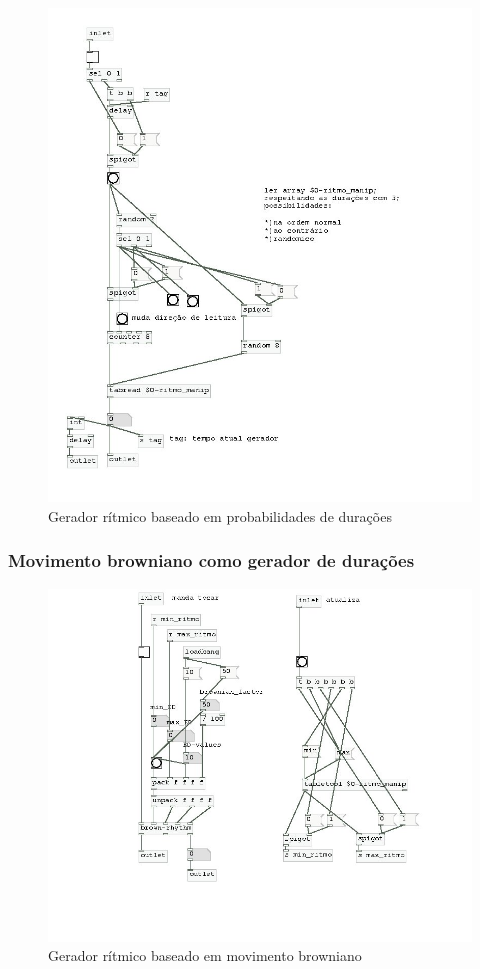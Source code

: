 \documentclass[draft]{ppgmus}
\begin{document}
\begin{figure}
\includegraphics[scale=.6]{gerador-ritmico1}
\caption{Gerador rítmico baseado em probabilidades de durações}
\label{gera-ritmico1}
\end{figure}  




 \subsubsection{Movimento browniano como gerador de durações}


\begin{figure}
\includegraphics[scale=.6]{gerador-ritmico2}
\caption{Gerador rítmico baseado em movimento browniano}
\label{gera-ritmico2}
\end{figure}  
\end{document}

